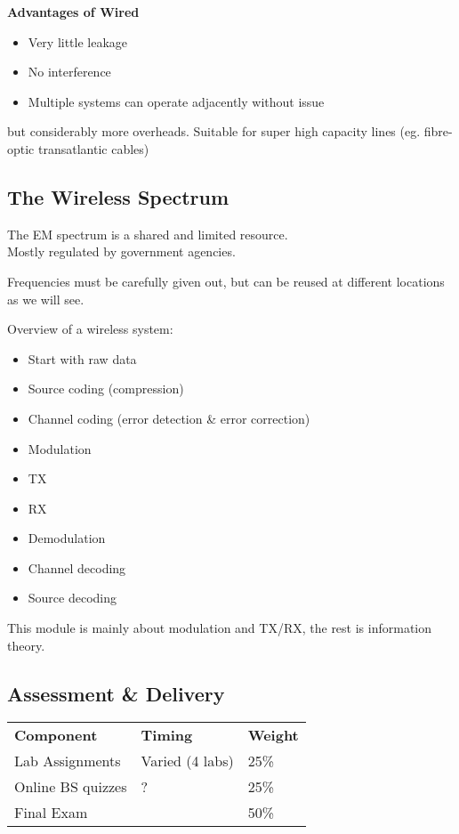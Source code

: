 \documentclass[12pt]{article}
\begin{document}
\textbf{Advantages of Wired}

\begin{itemize}[noitemsep]
    \item Very little leakage
    \item No interference
    \item Multiple systems can operate adjacently without issue
\end{itemize}
but considerably more overheads.
Suitable for super high capacity lines (eg. fibre-optic transatlantic cables)

\subsection{The Wireless Spectrum}
The EM spectrum is a shared and limited resource.\\
Mostly regulated by government agencies.

Frequencies must be carefully given out, but can be reused at different locations as we will see.

Overview of a wireless system:
\begin{itemize}[noitemsep]
\item Start with raw data
\item Source coding (compression)
\item Channel coding (error detection \& error correction)
\item Modulation
\item TX
\item RX
\item Demodulation
\item Channel decoding
\item Source decoding
\end{itemize}

This module is mainly about modulation and TX/RX, the rest is information theory.

\subsection{Assessment \& Delivery}
    \begin{tabular}{ l l l }
        \textbf{Component} & \textbf{Timing} & \textbf{Weight} \\
        Lab Assignments & Varied (4 labs) & 25\% \\
        Online BS quizzes & ? & 25\% \\
        Final Exam & & 50\%
    \end{tabular}
\end{document}
